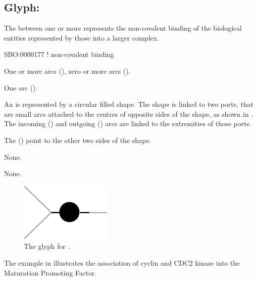 \subsection{Glyph: }
\label{sec:association}

The  between one or more  represents the non-covalent binding of the biological entities represented by those  into a larger complex.

\begin{glyphDescription}

\glyphSboTerm
SBO:0000177 ! non-covalent binding


\glyphIncoming
One or more  arcs (), zero or more  arcs ().



\glyphOutgoing
One  arc ().


\glyphContainer
An  is represented by a circular filled shape.
The shape is linked to two ports, that are small arcs attached to the centres of opposite sides of the shape, as shown in .
The incoming  () and outgoing  () arcs are linked to the extremities of those ports.

The  () point to the other two sides of the shape.

\glyphLabel
None.

\glyphAux
None.

\end{glyphDescription}

\begin{figure}[H]
  \centering
  \includegraphics{images/association}
  \caption{The \PD glyph for .}
  \label{fig:association}
\end{figure}

The example in  illustrates the association of cyclin and CDC2 kinase into the Maturation Promoting Factor.


